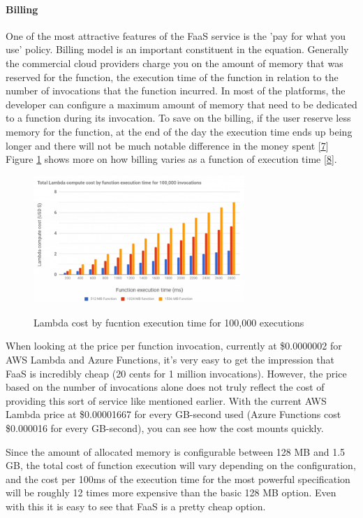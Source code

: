 \documentclass[12pt,titlepage]{article}
\begin{document}
\paragraph{Billing}
\label{sec:orge8a5956}
One of the most attractive features of the FaaS service is the 'pay for what you
use' policy. Billing model is an important constituent in the equation. Generally
the commercial cloud providers charge you on the amount of memory that was
reserved for the function, the execution time of the function in relation to the
number of invocations that the function incurred. In most of the platforms, the
developer can configure a maximum amount of memory that need to be dedicated to
a function during its invocation. To save on the billing, if the user reserve
less memory for the function, at the end of the day the execution time ends up
being longer and there will not be much notable difference in the money spent \hyperref[ref:7]{[7}]
Figure \ref{fig:lambda_billing} shows more on how billing varies as a function of execution
time \hyperref[ref:8]{[8}].
\begin{figure}[!h]
    \caption{Lambda cost by fucntion execution time for 100,000 executions}
    \centering
    \includegraphics[width=80mm]{./thesis_images/lambda_billing.png}
    \label{fig:lambda_billing}
\end{figure}

When looking at the price per function invocation, currently at \$0.0000002 for
AWS Lambda and Azure Functions, it's very easy to get the impression that FaaS
is incredibly cheap (20 cents for 1 million invocations). However, the price
based on the number of invocations alone does not truly reflect the cost of
providing this sort of service like mentioned earlier. With the current AWS
Lambda price at \$0.00001667 for every GB-second used (Azure Functions cost
\$0.000016 for every GB-second), you can see how the cost mounts quickly.

Since the amount of allocated memory is configurable between 128 MB and 1.5 GB,
the total cost of function execution will vary depending on the configuration,
and the cost per 100ms of the execution time for the most powerful specification
will be roughly 12 times more expensive than the basic 128 MB option. Even with
this it is easy to see that FaaS is a pretty cheap option.
\end{document}
